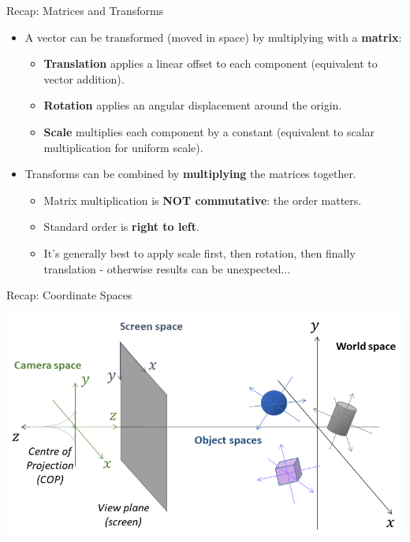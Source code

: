 \begin{frame}{Recap: Matrices and Transforms}
	\begin{itemize}
		\pause\item A vector can be transformed (moved in space) by multiplying with a \textbf{matrix}:
			\begin{itemize}
				\pause\item \textbf{Translation} applies a linear offset to each component (equivalent to vector addition).
				\pause\item \textbf{Rotation} applies an angular displacement around the origin.
				\pause\item \textbf{Scale} multiplies each component by a constant (equivalent to scalar multiplication for uniform scale).
			\end{itemize}
		\pause\item Transforms can be combined by \textbf{multiplying} the matrices together.
			\begin{itemize}
				\pause\item Matrix multiplication is \textbf{NOT commutative}: the order matters.
				\pause\item Standard order is \textbf{right to left}.
				\pause\item It's generally best to apply scale first, then rotation, then finally translation - otherwise results can be unexpected...
			\end{itemize}
	\end{itemize}
\end{frame}

\begin{frame}{Recap: Coordinate Spaces}
	\begin{center}
		\includegraphics[width=\textwidth]{coordinate_spaces}
	\end{center}
\end{frame}

